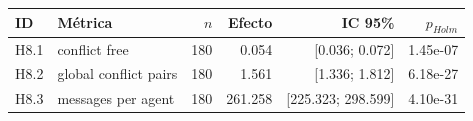 \begin{tabular}{llrrrr}
\toprule
ID & Métrica & $n$ & Efecto & IC 95\% & $p_{Holm}$ \\
\midrule
H8.1 & conflict free & 180 & 0.054 & [0.036; 0.072] & 1.45e-07 \\
H8.2 & global conflict pairs & 180 & 1.561 & [1.336; 1.812] & 6.18e-27 \\
H8.3 & messages per agent & 180 & 261.258 & [225.323; 298.599] & 4.10e-31 \\
\bottomrule
\end{tabular}
